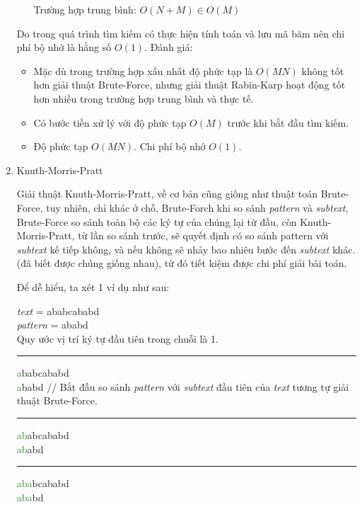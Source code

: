 \documentclass[a4paper,11pt]{article}
\begin{document}
\begin{enumerate}
\begin{itemize}
				Trường hợp trung bình: $O(N+M) \in O(M)$
			\end{itemize}
				Do trong quá trình tìm kiếm có thực hiện tính toán và lưu mã băm nên chi phí bộ nhớ là hằng số $O(1)$.
			Đánh giá:
			\begin{itemize}
				\item Mặc dù trong trường hợp xấu nhất độ phức tạp là $O(MN)$ không tốt hơn giải thuật Brute-Force, nhưng giải thuật Rabin-Karp hoạt động tốt hơn nhiều trong trường hợp trung bình và thực tế.
				\item Có bước tiền xử lý với độ phức tạp $O(M)$ trước khi bắt đầu tìm kiếm.
				\item Độ phức tạp $O(MN)$. Chi phí bộ nhớ $O(1)$.
			\end{itemize}
		\item Knuth-Morris-Pratt
		
			Giải thuật Knuth-Morris-Pratt, về cơ bản cũng giống như thuật toán Brute-Force, 
			tuy nhiên, chỉ khác ở chỗ, Brute-Forch khi so sánh \textit{pattern} và \textit{subtext}, Brute-Force so sánh toàn bộ 
			các ký tự của chúng lại từ đầu, còn Knuth-Morris-Pratt, từ lần so sánh trước, sẽ quyết định có so sánh pattern với \textit{subtext} kế tiếp không, 
			và nếu không sẽ nhảy bao nhiêu bước đến \textit{subtext} khác. 
			(đã biết được chúng giống nhau), từ đó tiết kiệm được chi phí giải bài toán.

			Để dễ hiểu, ta xét 1 ví dụ như sau: 
			
			\textit{text} \hspace*{6mm}= ababcababd\\
			\textit{pattern} \hspace*{0.3mm}= ababd\\
			Quy ước vị trí ký tự đầu tiên trong chuỗi là 1.
			
			\vspace*{4mm}
			\hrule
			\textcolor{ForestGreen}{a}babcababd\\
			\textcolor{ForestGreen}{a}babd \hspace*{1.8cm} // Bắt đầu so sánh \textit{pattern} với \textit{subtext} đầu tiên của \textit{text} tương tự giải thuật Brute-Force.

			\vspace*{2mm}
			\hrule
			\textcolor{ForestGreen}{ab}abcababd\\
			\textcolor{ForestGreen}{ab}abd
			
			\vspace*{2mm}
			\hrule
			\textcolor{ForestGreen}{aba}bcababd\\
			\textcolor{ForestGreen}{aba}bd


\end{enumerate}
\end{document}
